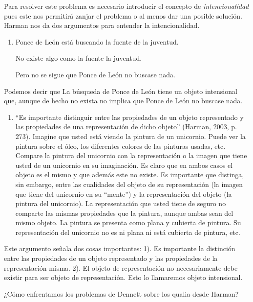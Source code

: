 \documentclass[]{book}
\begin{document}
Para resolver este problema es necesario introducir el concepto de
\emph{intencionalidad} pues este nos permitirá zanjar el problema o al
menos dar una posible solución. Harman nos da dos argumentos para
entender la intencionalidad.

\begin{enumerate}
\def\labelenumi{\arabic{enumi}.}
\item
  Ponce de León está buscando la fuente de la juventud.

  No existe algo como la fuente la juventud.

  Pero no se sigue que Ponce de León no buscase nada.
\end{enumerate}

Podemos decir que La búsqueda de Ponce de León tiene un objeto
intensional que, aunque de hecho no exista no implica que Ponce de León
no buscase nada.

\begin{enumerate}
\def\labelenumi{\arabic{enumi}.}
\item
  ``Es importante distinguir entre las propiedades de un objeto
  representado y las propiedades de una representación de dicho objeto''
  (Harman, 2003, p. 273). Imagine que usted está viendo la pintura de un
  unicornio. Puede ver la pintura sobre el óleo, los diferentes colores
  de las pinturas usadas, etc. Compare la pintura del unicornio con la
  representación o la imagen que tiene usted de un unicornio en su
  imaginación. Es claro que en ambos casos el objeto es el mismo y que
  además este no existe. Es importante que distinga, sin embargo, entre
  las cualidades del objeto de su representación (la imagen que tiene
  del unicornio en su ``mente'') y la representación del objeto (la
  pintura del unicornio). La representación que usted tiene de seguro no
  comparte las mismas propiedades que la pintura, aunque ambas sean del
  mismo objeto. La pintura se presenta como plana y cubierta de pintura.
  Su representación del unicornio no es ni plana ni está cubierta de
  pintura, etc.
\end{enumerate}

Este argumento señala dos cosas importantes: 1). Es importante la
distinción entre las propiedades de un objeto representado y las
propiedades de la representación misma. 2). El objeto de representación
no necesariamente debe existir para ser objeto de representación. Esto
lo llamaremos objeto intensional.

¿Cómo enfrentamos los problemas de Dennett sobre los qualia desde
Harman?
\end{document}
